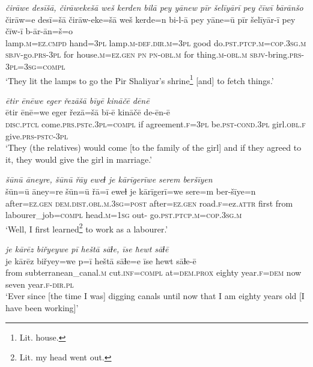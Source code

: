 \ea \label{ŽE.42}
\textit{čirāwe desīšā, čirāwekešā weš kerden bilā pey yānew pīr šelīyārī pey čīwī bārānšo} \\ 
\gll čirāw=e desī=šā čirāw-eke=šā weš kerde=n bi-l-ā pey yāne=ū pīr šelīyār-ī pey čīw-ī b-ār-ān=š=o \\ 
 lamp\textsc{.m}\textsc{=ez}\textsc{.cmpd} hand\textsc{=3pl} lamp\textsc{.m}\textsc{-def}\textsc{.dir}\textsc{.m}\textsc{=3pl} good do\textsc{.pst}\textsc{.ptcp}\textsc{.m}\textsc{=cop}\textsc{.3sg}\textsc{.m} \textsc{sbjv-}go\textsc{.prs}\textsc{-3pl} for house\textsc{.m}\textsc{\textsc{=ez.gen}} \textsc{pn} \textsc{pn}\textsc{-obl}\textsc{.m} for thing\textsc{.m}\textsc{-obl}\textsc{.m} \textsc{sbjv-}bring\textsc{.prs}\textsc{-3pl}\textsc{=3sg}\textsc{=compl} \\ 
\glt `They lit the lamps to go the Pir Shaliyar’s shrine\footnote{Lit. house.} [and] to fetch things.'
\z 
 
\ea \label{ŽE.84}
\textit{ētir ēnēwe eger řezāšā bīyē kināčē dēnē} \\ 
\gll ētir ēnē=we eger řezā=šā bī-ē kināčē de-ēn-ē \\ 
 \textsc{disc}.\textsc{ptcl} come\textsc{.prs}\textsc{.pst}c\textsc{.3pl}\textsc{=compl} if agreement\textsc{.f}\textsc{=3pl} be\textsc{.pst}\textsc{-cond}\textsc{.3pl} girl\textsc{.obl}\textsc{.f} give\textsc{.prs}\textsc{-pstc-3pl} \\ 
\glt `They (the relatives) would come [to the family of the girl] and if they agreed to it, they would give the girl in marriage.'
\z 
 
\ea \label{ŽM.4}
\textit{šūnū āneyre, šūnū řāy eweɫ je kārīgerīwe serem beršīyen} \\ 
\gll šūn=ū āney=re šūn=ū řā=ī eweɫ je kārīgerī=we sere=m ber-šīye=n \\ 
 after\textsc{=ez.gen} \textsc{dem.dist}\textsc{.obl}\textsc{.m}\textsc{.3sg}\textsc{=\textsc{post}} after\textsc{=ez.gen} road\textsc{.f}=ez.\textsc{attr} first from labourer\_job\textsc{=compl} head\textsc{.m}\textsc{=\textsc{1sg}} out- go\textsc{.pst}\textsc{.ptcp}\textsc{.m}\textsc{=cop}\textsc{.3sg}\textsc{.m} \\ 
\glt `Well, I first learned\footnote{Lit. my head went out.}  to work as a labourer.'
\z 
 
\ea \label{ŽM.7}
\textit{je kārēz biřyeywe pī heštā sāɫe, īse ħewt sāɫē} \\ 
\gll je kārēz biřyey=we p=ī heštā sāɫe=e īse ħewt sāɫe-ē \\ 
 from subterranean\_canal\textsc{.m} cut\textsc{.inf}\textsc{=compl} at=\textsc{dem.prox} eighty year\textsc{.f}\textsc{=dem} now seven year\textsc{.f}\textsc{-dir}\textsc{.pl} \\ 
\glt `Ever since [the time I was] digging canals until now that I am eighty years old [I have been working]'
\z 
 
